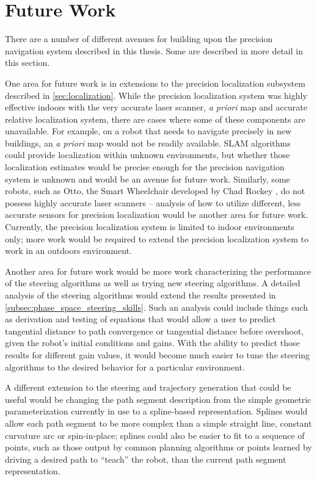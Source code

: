 \section{Future Work}\label{sec:future_work}

There are a number of different avenues for building upon the precision navigation system described in this thesis. Some are described in more detail in this section.

One area for future work is in extensions to the precision localization subsystem described in \autoref{sec:localization}. While the precision localization system was highly effective indoors with the very accurate laser scanner, \emph{a priori} map and accurate relative localization system, there are cases where some of these components are unavailable. For example, on a robot that needs to navigate precisely in new buildings, an \emph{a priori} map would not be readily available. SLAM algorithms could provide localization within unknown environments, but whether those localization estimates would be precise enough for the precision navigation system is unknown and would be an avenue for future work. Similarly, some robots, such as Otto, the Smart Wheelchair developed by Chad Rockey , do not possess highly accurate laser scanners -- analysis of how to utilize different, less accurate sensors for precision localization would be another area for future work. Currently, the precision localization system is limited to indoor environments only; more work would be required to extend the precision localization system to work in an outdoors environment.

Another area for future work would be more work characterizing the performance of the steering algorithms as well as trying new steering algorithms. A detailed analysis of the steering algorithms would extend the results presented in \autoref{subsec:phase_space_steering_skills}. Such an analysis could include things such as derivation and testing of equations that would allow a user to predict tangential distance to path convergence or tangential distance before overshoot, given the robot's initial conditions and gains. With the ability to predict those results for different gain values, it would become much easier to tune the steering algorithms to the desired behavior for a particular environment. 

A different extension to the steering and trajectory generation that could be useful would be changing the path segment description from the simple geometric parameterization currently in use to a spline-based representation. Splines would allow each path segment to be more complex than a simple straight line, constant curvature arc or spin-in-place; splines could also be easier to fit to a sequence of points, such as those output by common planning algorithms or points learned by driving a desired path to ``teach'' the robot, than the current path segment representation.

